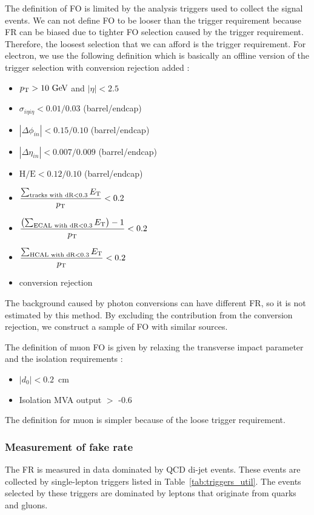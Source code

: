 The definition of FO is limited by the analysis triggers used to collect the signal events. 
We can not define FO to be looser than the trigger requirement because FR can be 
biased due to tighter FO selection caused by the trigger requirement. Therefore, the 
loosest selection that we can afford is the trigger requirement. For electron,  
we use the following definition which is basically an offline version of the trigger selection
with conversion rejection added : 
\begin{itemize}
  \item $p_\mathrm{T}>10~\mathrm{Ge\kern -0.1em V}$ and $|\eta| < 2.5$
  \item $\sigma_{i\eta i\eta} < 0.01/0.03$ (barrel/endcap)
  \item $|\Delta\phi_{in}| < 0.15/0.10$ (barrel/endcap)
  \item $|\Delta\eta_{in}| < 0.007/0.009$ (barrel/endcap)
  \item $\textrm{H/E}< 0.12/0.10$ (barrel/endcap)
  \item $\displaystyle \frac{\sum_{\textrm{tracks with dR}<0.3}E_\mathrm{T}}{p_\mathrm{T}}<0.2$
  \item $\displaystyle \frac{\left(\sum_{\textrm{ECAL with dR}<0.3}E_\mathrm{T}\right)-1}{p_\mathrm{T}}<0.2$
  \item $\displaystyle \frac{\sum_{\textrm{HCAL with dR}<0.3}E_\mathrm{T}}{p_\mathrm{T}}<0.2$
  \item conversion rejection 
\end{itemize}
The background caused by photon conversions 
can have different FR, so it is not estimated by this method. 
By excluding the contribution from the conversion rejection, 
we construct a sample of FO with similar sources. 

The definition of muon FO is given by relaxing the transverse impact parameter and 
the isolation requirements :  
\begin{itemize}
    \item $\left|d_0\right| < 0.2$~cm
    \item Isolation MVA output $>$ -0.6
\end{itemize}
The definition for muon is simpler because of the loose trigger requirement. 

\subsubsection{Measurement of fake rate}

The FR is measured in data dominated by QCD di-jet events. 
These events are collected by single-lepton triggers listed in Table~\ref{tab:triggers_util}.
The events selected by these triggers are dominated by leptons that 
originate from quarks and gluons. 

